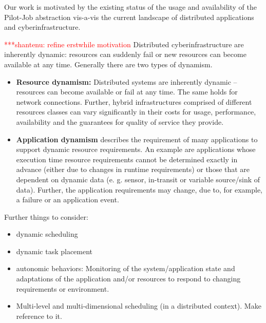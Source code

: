 \documentclass[conference,final]{IEEEtran}
\newcommand{\jhanote}[1]{ {\textcolor{red} { ***shantenu: #1 }}}
\newcommand{\jhanote}[1]{}
\begin{document}
Our work is motivated by the existing status of the usage and
availability of the Pilot-Job abstraction vis-a-vis the current
landscape of distributed applications and cyberinfrastructure.



\jhanote{refine erstwhile motivation} Distributed cyberinfrastructure
are inherently dynamic: resources can suddenly fail or new resources
can become available at any time. Generally there are two types of
dynamism.

\begin{itemize}
\item \textbf{Resource dynamism:} Distributed systems are inherently dynamic
     -- resources can become available or fail at any time. The same holds for
      network connections. Further, hybrid infrastructures comprised of 
      different resources classes can vary significantly in their costs for 
      usage, performance, availability and the guarantees for quality of service 
      they provide.
      
\item \textbf{Application dynamism} describes the requirement of many
applications to support dynamic resource requirements. An example are
applications whose execution time resource requirements cannot be determined
exactly in advance (either due to changes in runtime requirements) or those that
are dependent on dynamic data (e. g. sensor, in-transit or variable source/sink
of data). Further, the application requirements may change, due to,
for example, a failure or an application event.
\end{itemize}

Further things to consider:
\begin{itemize}
    \item dynamic scheduling
    \item dynamic task placement
    \item autonomic behaviors: Monitoring of the system/application state and 
    adaptations of the application and/or resources to respond to changing 
    requirements or environment.
  \item Multi-level and multi-dimensional scheduling (in a distributed
    context). Make reference to it.
\end{itemize}
\end{document}
